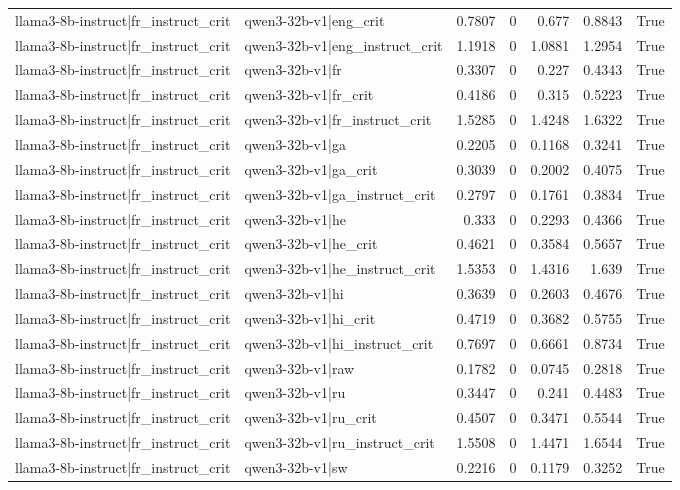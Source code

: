 \begin{table}
\begin{tabular}{l l r r r r l}
llama3-8b-instruct|fr_instruct_crit & qwen3-32b-v1|eng_crit & 0.7807 & 0 & 0.677 & 0.8843 & True \\
llama3-8b-instruct|fr_instruct_crit & qwen3-32b-v1|eng_instruct_crit & 1.1918 & 0 & 1.0881 & 1.2954 & True \\
llama3-8b-instruct|fr_instruct_crit & qwen3-32b-v1|fr & 0.3307 & 0 & 0.227 & 0.4343 & True \\
llama3-8b-instruct|fr_instruct_crit & qwen3-32b-v1|fr_crit & 0.4186 & 0 & 0.315 & 0.5223 & True \\
llama3-8b-instruct|fr_instruct_crit & qwen3-32b-v1|fr_instruct_crit & 1.5285 & 0 & 1.4248 & 1.6322 & True \\
llama3-8b-instruct|fr_instruct_crit & qwen3-32b-v1|ga & 0.2205 & 0 & 0.1168 & 0.3241 & True \\
llama3-8b-instruct|fr_instruct_crit & qwen3-32b-v1|ga_crit & 0.3039 & 0 & 0.2002 & 0.4075 & True \\
llama3-8b-instruct|fr_instruct_crit & qwen3-32b-v1|ga_instruct_crit & 0.2797 & 0 & 0.1761 & 0.3834 & True \\
llama3-8b-instruct|fr_instruct_crit & qwen3-32b-v1|he & 0.333 & 0 & 0.2293 & 0.4366 & True \\
llama3-8b-instruct|fr_instruct_crit & qwen3-32b-v1|he_crit & 0.4621 & 0 & 0.3584 & 0.5657 & True \\
llama3-8b-instruct|fr_instruct_crit & qwen3-32b-v1|he_instruct_crit & 1.5353 & 0 & 1.4316 & 1.639 & True \\
llama3-8b-instruct|fr_instruct_crit & qwen3-32b-v1|hi & 0.3639 & 0 & 0.2603 & 0.4676 & True \\
llama3-8b-instruct|fr_instruct_crit & qwen3-32b-v1|hi_crit & 0.4719 & 0 & 0.3682 & 0.5755 & True \\
llama3-8b-instruct|fr_instruct_crit & qwen3-32b-v1|hi_instruct_crit & 0.7697 & 0 & 0.6661 & 0.8734 & True \\
llama3-8b-instruct|fr_instruct_crit & qwen3-32b-v1|raw & 0.1782 & 0 & 0.0745 & 0.2818 & True \\
llama3-8b-instruct|fr_instruct_crit & qwen3-32b-v1|ru & 0.3447 & 0 & 0.241 & 0.4483 & True \\
llama3-8b-instruct|fr_instruct_crit & qwen3-32b-v1|ru_crit & 0.4507 & 0 & 0.3471 & 0.5544 & True \\
llama3-8b-instruct|fr_instruct_crit & qwen3-32b-v1|ru_instruct_crit & 1.5508 & 0 & 1.4471 & 1.6544 & True \\
llama3-8b-instruct|fr_instruct_crit & qwen3-32b-v1|sw & 0.2216 & 0 & 0.1179 & 0.3252 & True \\

\end{tabular}
\end{table}
